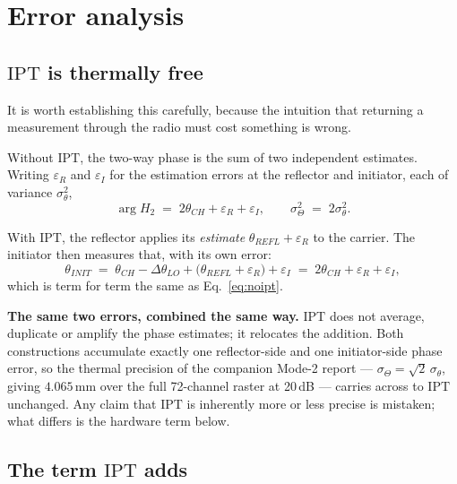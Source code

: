 \documentclass[11pt,a4paper]{article}
\newcommand{\IPT}{\ensuremath{\mathrm{IPT}}}
\begin{document}
\section{Error analysis}
\label{sec:error}

\subsection{\IPT{} is thermally free}

It is worth establishing this carefully, because the intuition that returning a measurement through
the radio must cost something is wrong.

Without \IPT, the two-way phase is the sum of two independent estimates. Writing $\varepsilon_R$ and
$\varepsilon_I$ for the estimation errors at the reflector and initiator, each of variance
$\sigma_\theta^2$,
\begin{equation}
\arg H_2 \;=\; 2\theta_{CH} + \varepsilon_R + \varepsilon_I,
\qquad
\sigma_\Theta^2 \;=\; 2\sigma_\theta^2 .
\label{eq:noipt}
\end{equation}

With \IPT, the reflector applies its \emph{estimate} $\theta_{REFL}+\varepsilon_R$ to the carrier.
The initiator then measures that, with its own error:
\begin{equation}
\theta_{INIT} \;=\; \theta_{CH} - \Delta\theta_{LO} + \bigl(\theta_{REFL}+\varepsilon_R\bigr) + \varepsilon_I
 \;=\; 2\theta_{CH} + \varepsilon_R + \varepsilon_I ,
\label{eq:ipterr}
\end{equation}
which is term for term the same as Eq.~\eqref{eq:noipt}.

\begin{callout}
\textbf{The same two errors, combined the same way.} \IPT{} does not average, duplicate or amplify the
phase estimates; it relocates the addition. Both constructions accumulate exactly one reflector-side
and one initiator-side phase error, so the thermal precision of the companion Mode-2 report ---
$\sigma_\Theta = \sqrt2\,\sigma_\theta$, giving $4.065$\,mm over the full 72-channel raster at
20\,dB --- carries across to \IPT{} unchanged. Any claim that \IPT{} is inherently more or less
precise is mistaken; what differs is the hardware term below.
\end{callout}

\subsection{The term \IPT{} adds}
\end{document}

